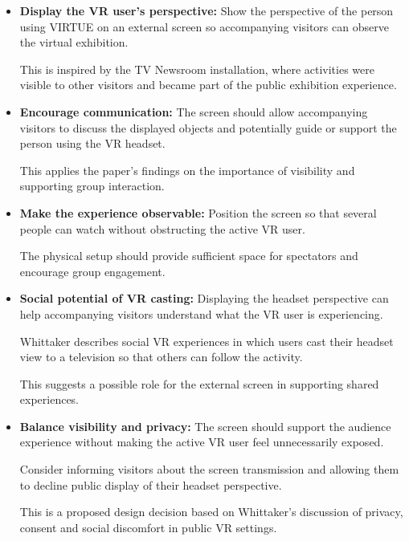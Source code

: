 \begin{itemize}

    \item \textbf{Display the VR user's perspective:}
    Show the perspective of the person using VIRTUE on an
    external screen so accompanying visitors can observe
    the virtual exhibition.

    This is inspired by the TV Newsroom installation, where
    activities were visible to other visitors and became
    part of the public exhibition experience.
    \cite[pp.~140--142]{hornecker_learning_2006}

    \item \textbf{Encourage communication:}
    The screen should allow accompanying visitors to
    discuss the displayed objects and potentially guide
    or support the person using the VR headset.

    This applies the paper's findings on the importance
    of visibility and supporting group interaction.
    \cite[pp.~140--142]{hornecker_learning_2006}

    \item \textbf{Make the experience observable:}
    Position the screen so that several people can watch
    without obstructing the active VR user.

    The physical setup should provide sufficient space
    for spectators and encourage group engagement.
    \cite[p.~141]{hornecker_learning_2006}

    \item \textbf{Social potential of VR casting:}
    Displaying the headset perspective can help accompanying
    visitors understand what the VR user is experiencing.

    Whittaker describes social VR experiences in which
    users cast their headset view to a television so that
    others can follow the activity.

    This suggests a possible role for the external screen
    in supporting shared experiences.
    \cite[pp.~89--90]{whittaker_onboarding_2025}

    \item \textbf{Balance visibility and privacy:}
    The screen should support the audience experience
    without making the active VR user feel unnecessarily
    exposed.

    Consider informing visitors about the screen
    transmission and allowing them to decline public
    display of their headset perspective.

    This is a proposed design decision based on
    Whittaker's discussion of privacy, consent and
    social discomfort in public VR settings.
    \cite[pp.~90--91]{whittaker_onboarding_2025}
    \cite[p.~102]{whittaker_onboarding_2025}


\end{itemize}

